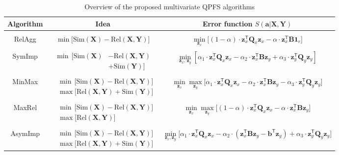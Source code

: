 \documentclass[12pt,twoside]{article}
\theoremstyle{definition}
\newcommand{\ba}{\mathbf{a}}
\newcommand{\bz}{\mathbf{z}}
\newcommand{\bb}{\mathbf{b}}
\newcommand{\bY}{\mathbf{Y}}
\newcommand{\bX}{\mathbf{X}}
\newcommand{\bB}{\mathbf{B}}
\newcommand{\bQ}{\mathbf{Q}}
\newcommand{\T}{\mathsf{T}}
\newcommand{\bOne}{\boldsymbol{1}}
\begin{document}
\begin{table}
	\centering
	\small{
		\begin{tabular}{c|c|c}
			\hline
			Algorithm & Idea & Error function $S(\ba | \bX, \bY)$ \\
			\hline && \\ [-.5em]
			RelAgg & $\min \bigl[ \text{Sim}(\bX) - \text{Rel}(\bX, \bY) \bigr] $ & $\min\limits_{\bz_x} \bigl[ (1 - \alpha) \cdot \bz_x^{\T} \bQ_x \bz_x - \alpha \cdot \bz_x^{\T} \bB \bOne_r \bigr] $ \\ &&\\[-.5em]
			SymImp & $\begin{aligned} \min \, \bigl[ \text{Sim}(\bX) & - \text{Rel}(\bX, \bY) \\ & + \text{Sim}(\bY) \bigr] \end{aligned}$ & $ \min\limits_{\bz_x, \, \bz_y} \left[ \alpha_1 \cdot \bz_x^{\T} \bQ_x \bz_x - \alpha_2 \cdot \bz_x^{\T} \bB \bz_y + \alpha_3 \cdot \bz_y^{\T} \bQ_y \bz_y \right] $\\ &&\\ [-.5em]
			MinMax & $\begin{aligned} &\min \, \bigl[ \text{Sim}(\bX) - \text{Rel}(\bX, \bY) \bigr]  \\ & \max \bigl[\text{Rel}(\bX, \bY) + \text{Sim}(\bY) \bigr] \end{aligned}$ & $	\min\limits_{\bz_x} 	\max\limits_{\bz_y} \bigl[\alpha_1 \cdot \bz_x^{\T} \bQ_x \bz_x - \alpha_2 \cdot \bz_x^{\T} \bB \bz_y - \alpha_3 \cdot \bz_y^{\T} \bQ_y \bz_y \bigr]$ \\ &&\\ 
			MaxRel & $\begin{aligned} &\min \, \bigl[ \text{Sim}(\bX) - \text{Rel}(\bX, \bY) \bigr]  \\ & \max \bigl[\text{Rel}(\bX, \bY) \bigr] \end{aligned}$& $\min\limits_{\bz_x} 	\max\limits_{\bz_y} \bigl[ (1 - \alpha) \cdot \bz_x^{\T} \bQ_x \bz_x - \alpha \cdot \bz_x^{\T} \bB \bz_y \bigr]$ \\ 		&&\\ [-.5em]
			AsymImp & $\begin{aligned} & \min \, \bigl[ \text{Sim}(\bX) - \text{Rel}(\bX, \bY) \bigr]\\ &  \max \bigl[\text{Rel}(\bX, \bY) + \text{Sim}(\bY) \bigr] \end{aligned}$ & $\min\limits_{\bz_x, \bz_y} \bigl[ \alpha_1 \cdot \bz_x^{\T} \bQ_x \bz_x - \alpha_2 \cdot \left(\bz_x^{\T} \bB \bz_y - \bb^{\T} \bz_y \right) + \alpha_3 \cdot \bz_y^{\T} \bQ_y \bz_y \bigr]$\\ 
			\hline
	\end{tabular}}
	\caption{Overview of the proposed multivariate QPFS algorithms}
	\label{tbl:summary}
\end{table}
\end{document}
